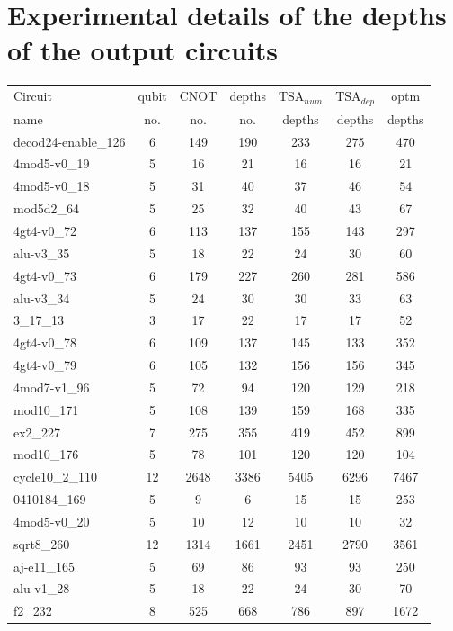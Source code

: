 \documentclass[runningheads]{llncs}
\begin{document}
\section{Experimental details of the depths of the output circuits}
\begin{table}[!ht]
	\begin{center}  
		\begin{tabular}{|p{4.3cm}<{\centering}|c|c|c|c|c|c|}
			\hline
						Circuit &  qubit  & CNOT &depths &TSA$_{num}$& TSA$_{dep}$  & optm 	  	\\
						 name	&   no. 	&	no. & no. & depths&  depths &  depths 	\\
						\hline
						decod24-enable\_126 & 6 & 149 & 190 & 233 & 275 & 470 \\
4mod5-v0\_19 & 5 & 16 & 21 & 16 & 16 & 21 \\
4mod5-v0\_18 & 5 & 31 & 40 & 37 & 46 & 54 \\
mod5d2\_64 & 5 & 25 & 32 & 40 & 43 & 67 \\
4gt4-v0\_72 & 6 & 113 & 137 & 155 & 143 & 297 \\
alu-v3\_35 & 5 & 18 & 22 & 24 & 30 & 60 \\
4gt4-v0\_73 & 6 & 179 & 227 & 260 & 281 & 586 \\
alu-v3\_34 & 5 & 24 & 30 & 30 & 33 & 63 \\
3\_17\_13 & 3 & 17 & 22 & 17 & 17 & 52 \\
4gt4-v0\_78 & 6 & 109 & 137 & 145 & 133 & 352 \\
4gt4-v0\_79 & 6 & 105 & 132 & 156 & 156 & 345 \\
4mod7-v1\_96 & 5 & 72 & 94 & 120 & 129 & 218 \\
mod10\_171 & 5 & 108 & 139 & 159 & 168 & 335 \\
ex2\_227 & 7 & 275 & 355 & 419 & 452 & 899 \\
mod10\_176 & 5 & 78 & 101 & 120 & 120 & 104 \\
cycle10\_2\_110 & 12 & 2648 & 3386 & 5405 & 6296 & 7467 \\
0410184\_169 & 5 & 9 & 6 & 15 & 15 & 253 \\
4mod5-v0\_20 & 5 & 10 & 12 & 10 & 10 & 32 \\
sqrt8\_260 & 12 & 1314 & 1661 & 2451 & 2790 & 3561 \\
aj-e11\_165 & 5 & 69 & 86 & 93 & 93 & 250 \\
alu-v1\_28 & 5 & 18 & 22 & 24 & 30 & 70 \\
f2\_232 & 8 & 525 & 668 & 786 & 897 & 1672 \\

\end{tabular}
\end{center}
\end{table}
\end{document}
